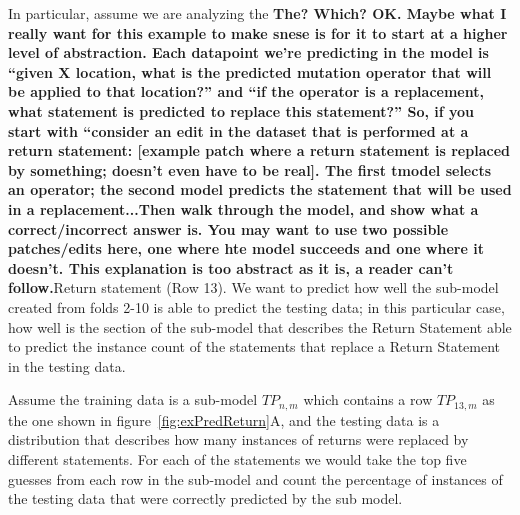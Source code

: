\documentclass[conference]{IEEEtran}
\newcommand{\todo}[1]
  {{\scriptsize \textbf{\color{red} {#1}}}}
\begin{document}
{In 
particular, assume we are analyzing the\todo{The? Which?  OK.  Maybe what I
  really want for this example to make snese is for it to start at a higher
  level of abstraction.  Each datapoint we're predicting in the model is ``given
  X location, what is the predicted mutation operator that will be applied to
  that location?''  and ``if the operator is a replacement, what statement is
  predicted to replace this statement?''  So, if you start with ``consider an
  edit in the dataset that is performed at a return statement: [example patch
  where a return statement is replaced by something; doesn't even have to be
  real].  The first tmodel selects an operator; the second model predicts the
  statement that will be used in a replacement...Then walk through the model,
  and show what a correct/incorrect answer is.  You may want to use two possible
  patches/edits here, one where hte model succeeds and one where it doesn't.
  This explanation is too abstract as it is, a reader can't follow.}Return statement (Row 13). We want to 
predict 
how well the sub-model created from folds 2-10 is able to predict the testing 
data; in this particular case, how well is the section of the sub-model that 
describes the Return Statement able to predict the instance count of the 
statements that replace a Return Statement in the testing data.

Assume the training data is a sub-model $TP_{n,m}$ which contains a row 
$TP_{13,m}$ as the one shown in figure~\ref{fig:exPredReturn}A, and the testing data is a distribution that describes 
how many instances of returns were replaced by different statements.
For each of the statements we would take the top five guesses from each row in 
the sub-model and count the percentage of instances of the testing data that were correctly 
predicted by the sub model. 

}
\end{document}
